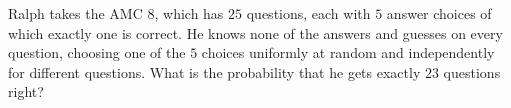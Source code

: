 Ralph takes the AMC 8, which has $25$ questions, each with $5$ answer choices of which exactly one is correct. He knows none of the answers and guesses on every question, choosing one of the $5$ choices uniformly at random and independently for different questions. What is the probability that he gets exactly $23$ questions right?
